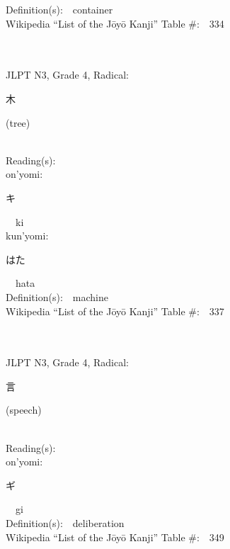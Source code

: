 \begin{multicols}{2}
Definition(s):\ \ container \\
Wikipedia ``List of the J\=oy\=o Kanji'' Table \#:\ \ 334 \\
\ \ \\
{\fontsize{34pt}{40pt}  }\ \ \\  %
{JLPT N3, Grade 4, Radical:\ \ {\begin{CJK}{UTF8}{min} 木 \end{CJK}} (tree) } \\
Reading(s):\ \ \\
{\hspace*{1em}}on'yomi:\ \ \\
{\hspace*{2em}}{\begin{CJK}{UTF8}{min} キ \end{CJK}}\ \ ki\ \ \\
{\hspace*{1em}}kun'yomi:\ \ \\
{\hspace*{2em}}{\begin{CJK}{UTF8}{min} はた \end{CJK}}\ \ hata\ \ \\
Definition(s):\ \ machine \\
Wikipedia ``List of the J\=oy\=o Kanji'' Table \#:\ \ 337 \\
\ \ \\
{\fontsize{34pt}{40pt}  }\ \ \\  %
{JLPT N3, Grade 4, Radical:\ \ {\begin{CJK}{UTF8}{min} 言 \end{CJK}} (speech) } \\
Reading(s):\ \ \\
{\hspace*{1em}}on'yomi:\ \ \\
{\hspace*{2em}}{\begin{CJK}{UTF8}{min} ギ \end{CJK}}\ \ gi\ \ \\
Definition(s):\ \ deliberation \\
Wikipedia ``List of the J\=oy\=o Kanji'' Table \#:\ \ 349 \\

\end{multicols}
